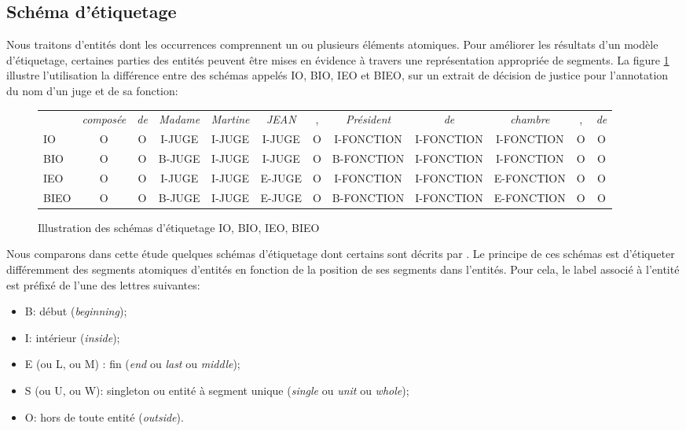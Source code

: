 
\subsection{Schéma d'étiquetage}
Nous traitons d'entités dont les occurrences comprennent un ou plusieurs éléments atomiques. Pour améliorer les résultats d'un modèle d'étiquetage, certaines parties des entités peuvent être mises en évidence à travers une représentation appropriée de segments. La figure \ref{p4_sample-tagmod} illustre l'utilisation la différence entre des schémas appelés IO, BIO, IEO et BIEO, sur un extrait de décision de justice pour l'annotation du nom d'un juge et de sa fonction:
\begin{figure}[!h]
	\tiny
	\begin{tabular}{l|ccccccccccc}
		& \textit{composée} & \textit{de} & \textit{Madame} & \textit{Martine} & \textit{JEAN} & , & \textit{Président} & \textit{de} & \textit{chambre} & , & \textit{de} \\ 
		IO & O & O & I-JUGE & I-JUGE & I-JUGE & O & I-FONCTION & I-FONCTION & I-FONCTION & O & O \\
		BIO & O & O & B-JUGE & I-JUGE & I-JUGE & O & B-FONCTION & I-FONCTION & I-FONCTION & O & O \\
		IEO & O & O & I-JUGE & I-JUGE & E-JUGE & O & I-FONCTION & I-FONCTION & E-FONCTION & O & O \\
		BIEO & O & O & B-JUGE & I-JUGE & E-JUGE & O & B-FONCTION & I-FONCTION & E-FONCTION & O & O \\
	\end{tabular}
	\caption{Illustration des schémas d'étiquetage IO, BIO, IEO, BIEO}\label{p4_sample-tagmod}
\end{figure}

Nous comparons dans cette étude quelques schémas d'étiquetage dont certains sont décrits par \citet{konkol2015tagModel}. Le principe de ces schémas est d'étiqueter différemment des segments atomiques d'entités en fonction de la position de ses segments dans l'entités. Pour cela, le label associé à l'entité est préfixé de l'une des lettres suivantes:

\begin{itemize}
	\item B:  début (\textit{beginning});
	\item I: intérieur (\textit{inside});
	\item E (ou L, ou M) : fin (\textit{end} ou \textit{last} ou \textit{middle});
	\item S (ou U, ou W): singleton ou entité à segment unique (\textit{single} ou \textit{unit} ou \textit{whole});
	\item O: hors de toute entité (\textit{outside}).
\end{itemize}

